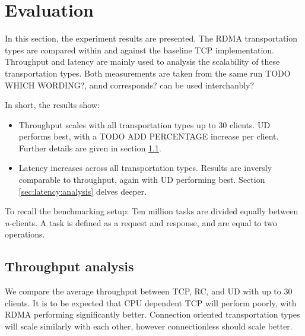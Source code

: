 
\chapter{Evaluation}\label{ch:evaluation} %



\ifpdf
    \graphicspath{{figures/PNG}}
\else
    \graphicspath{{7/figures/EPS/}{7/figures/}}
\fi


% 
In this section, the experiment results are presented.
The RDMA transportation types are compared within and against the baseline TCP implementation.
Throughput and latency are mainly used to analysis the scalability of these transportation types.
Both measurements are taken from the same run TODO WHICH WORDING?, annd corresponds? can be used interchanbly?

In short, the results show:
\begin{itemize}
    \item Throughput scales with all transportation types up to 30 clients. UD performs best, with a TODO ADD PERCENTAGE increase per client. Further details are given in section \ref{sec:throughput-analysis}.
    \item Latency increases across all transportation types. Results are inversly comparable to throughput, again with UD performing best. Section \ref{sec:latency:analysis} delves deeper.
\end{itemize}

To recall the benchmarking setup:
Ten million tasks are divided equally between \textit{n}-clients.
A task is defined as a request and response, and are equal to two operations.

\section{Throughput analysis}\label{sec:throughput-analysis}
We compare the average throughput between TCP, RC, and UD with up to 30 clients.
It is to be expected that CPU dependent TCP will perform poorly, with RDMA performing significantly better.
Connection oriented transportation types will scale similarly with each other, however connectionless should scale better.

